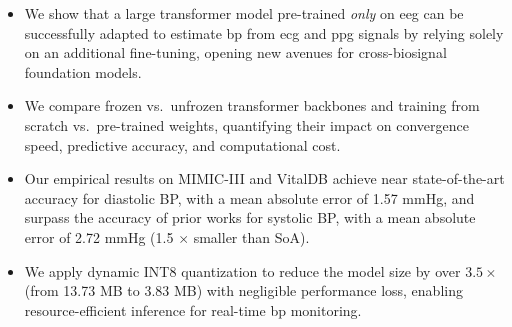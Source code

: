 \begin{itemize}
    \item We show that a large transformer model pre-trained \textit{only} on \gls{eeg} can be successfully adapted to estimate \gls{bp} from \gls{ecg} and \gls{ppg} signals by relying solely on an additional fine-tuning, opening new avenues for cross-biosignal foundation models.

     \item We compare frozen vs.\ unfrozen transformer backbones and training from scratch vs.\ pre-trained weights, quantifying their impact on convergence speed, predictive accuracy, and computational cost.
     
    \item Our empirical results on MIMIC-III and VitalDB achieve near state-of-the-art accuracy for diastolic BP, with a mean absolute error of 1.57 mmHg, and surpass the accuracy of prior works for systolic BP, with a mean absolute error of 2.72 mmHg (1.5 $\times$ smaller than SoA).

    \item We apply dynamic INT8 quantization to reduce the model size by over $3.5\times$ (from 13.73 MB to 3.83 MB)  with negligible performance loss, enabling resource-efficient inference for real-time \gls{bp} monitoring.
\end{itemize}